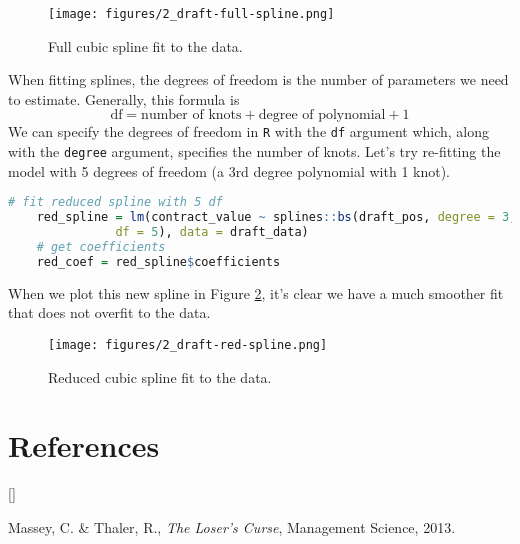 \documentclass[twoside]{article}
\def\beginrefs{\begin{list}%
        {[\arabic{equation}]}{\usecounter{equation}
         \setlength{\leftmargin}{2.0truecm}\setlength{\labelsep}{0.4truecm}%
         \setlength{\labelwidth}{1.6truecm}}}
\def\endrefs{\end{list}}
\def\bibentry#1{\item[\hbox{[#1]}]}
\theoremstyle{definition}
\begin{document}
\begin{figure}[h]
    \centering
    \texttt{[image: figures/2\_draft-full-spline.png]}
    \caption{Full cubic spline fit to the data.}
    \label{fig:draft-full-spline}
\end{figure}

When fitting splines, the degrees of freedom is the number of parameters we need to estimate. Generally, this formula is
\begin{equation}
    \text{df} = \text{number of knots} + \text{degree of polynomial} + 1
\end{equation}
We can specify the degrees of freedom in \texttt{R} with the \texttt{df} argument which, along with the \texttt{degree} argument, specifies the number of knots. Let's try re-fitting the model with 5 degrees of freedom (a 3rd degree polynomial with 1 knot).
\begin{lstlisting}[language=R]
    # fit reduced spline with 5 df
    red_spline = lm(contract_value ~ splines::bs(draft_pos, degree = 3,
               df = 5), data = draft_data)
    # get coefficients
    red_coef = red_spline$coefficients
\end{lstlisting}
When we plot this new spline in Figure \ref{fig:draft-red-spline}, it's clear we have a much smoother fit that does not overfit to the data.
\begin{figure}[H]
    \centering
    \texttt{[image: figures/2\_draft-red-spline.png]}
    \caption{Reduced cubic spline fit to the data.}
    \label{fig:draft-red-spline}
\end{figure}

\section*{References}
\beginrefs
\bibentry{M-T}{Massey, C. \& Thaler, R.}, 
{\it The Loser's Curse},
{Management Science},
{2013}.
\endrefs
\end{document}

